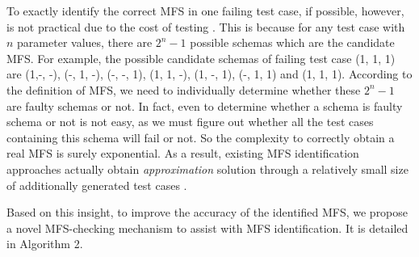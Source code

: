 \documentclass[10pt,journal,compsoc]{IEEEtran}
\begin{document}

To exactly identify the correct MFS in one failing test case, if possible, however, is not practical due to the cost of testing \cite{nie2011minimal,colbourn2008locating}. This is because for any test case with $n$ parameter values, there are $2^{n} - 1$ possible schemas which are the candidate MFS. For example, the possible candidate schemas of failing test case (1, 1, 1) are  (1,-, -), (-, 1, -), (-, -, 1), (1, 1, -), (1, -, 1), (-, 1, 1) and (1, 1, 1). According to the definition of MFS, we need to individually determine whether these $2^{n} - 1$ are faulty schemas or not. In fact, even to determine whether a schema is faulty schema or not is not easy, as we must figure out whether all the test cases containing this schema will fail or not. So the complexity to correctly obtain a real MFS is surely exponential. As a result, existing MFS identification approaches actually obtain \emph{approximation} solution through a relatively small size of additionally generated test cases \cite{nie2011minimal,niu2013identifying,zhang2011characterizing,colbourn2008locating,li2012improved,martinez2008algorithms,ghandehari2012identifying}.

Based on this insight, to improve the accuracy of the identified MFS, we propose a novel MFS-checking mechanism to assist with MFS identification. It is detailed in Algorithm 2.
\end{document}
